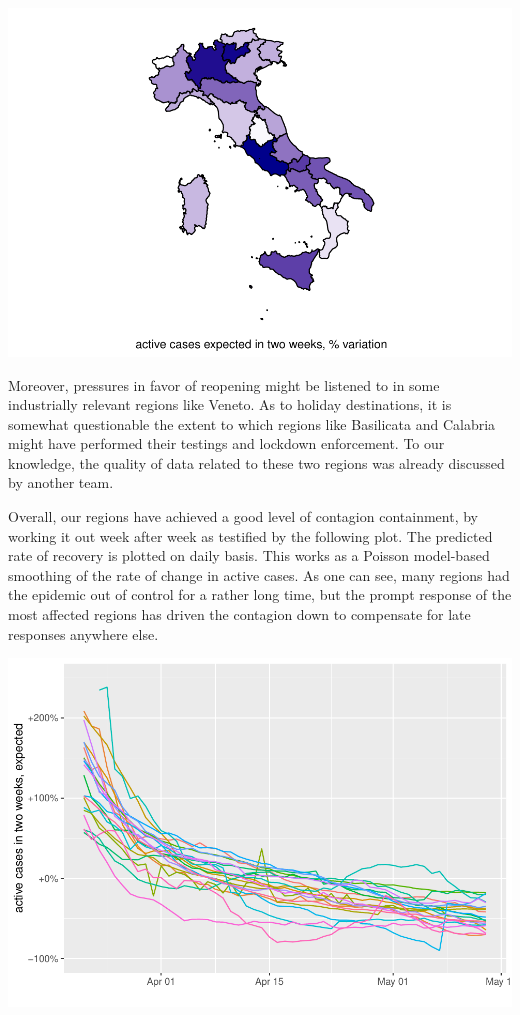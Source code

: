 \documentclass[
  6pt,
]{article}
\begin{document}
\begin{center}\includegraphics{Report_SC_Group3_files/figure-latex/unnamed-chunk-37-1} \end{center}

Moreover, pressures in favor of reopening might be listened to in some
industrially relevant regions like Veneto. As to holiday destinations,
it is somewhat questionable the extent to which regions like Basilicata
and Calabria might have performed their testings and lockdown
enforcement. To our knowledge, the quality of data related to these two
regions was already discussed by another team.

Overall, our regions have achieved a good level of contagion
containment, by working it out week after week as testified by the
following plot. The predicted rate of recovery is plotted on daily
basis. This works as a Poisson model-based smoothing of the rate of
change in active cases. As one can see, many regions had the epidemic
out of control for a rather long time, but the prompt response of the
most affected regions has driven the contagion down to compensate for
late responses anywhere else.

\begin{center}\includegraphics[width=0.7\linewidth]{Report_SC_Group3_files/figure-latex/unnamed-chunk-38-1} \end{center}
\end{document}
